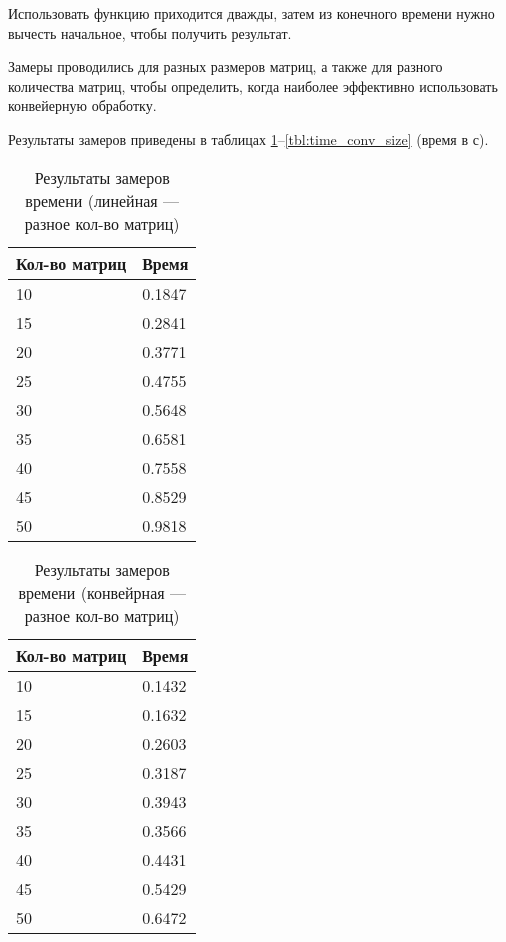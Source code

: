 Использовать функцию приходится дважды, затем из конечного времени нужно вычесть начальное, чтобы получить результат.

Замеры проводились для разных размеров матриц, а также для разного количества матриц, чтобы определить, когда наиболее эффективно использовать конвейерную обработку.

Результаты замеров приведены в таблицах \ref{tbl:time_lin_count}--\ref{tbl:time_conv_size} (время в с).

\begin{table}[h]
	\begin{center}
		\begin{threeparttable}
			\captionsetup{justification=raggedright,singlelinecheck=off}
			\caption{Результаты замеров времени (линейная --- разное кол-во матриц)}
			\label{tbl:time_lin_count}
			\begin{tabular}{|p{6cm}|p{6cm}|}
				\hline
				Кол-во матриц & Время \\
				\hline
				10 & 0.1847 \\ \hline 
				15 & 0.2841 \\ \hline 
				20 & 0.3771 \\ \hline 
				25 & 0.4755 \\ \hline 
				30 & 0.5648 \\ \hline 
				35 & 0.6581 \\ \hline 
				40 & 0.7558 \\ \hline 
				45 & 0.8529 \\ \hline 
				50 & 0.9818 \\ \hline  
			\end{tabular}
		\end{threeparttable}
	\end{center}
\end{table}


\begin{table}[h]
	\begin{center}
		\begin{threeparttable}
			\captionsetup{justification=raggedright,singlelinecheck=off}
			\caption{Результаты замеров времени (конвейрная --- разное кол-во матриц)}
			\label{tbl:time_conv_count}
			\begin{tabular}{|p{6cm}|p{6cm}|}
				\hline
				Кол-во матриц & Время \\
				\hline
				10 & 0.1432 \\ \hline 
				15 & 0.1632 \\ \hline 
				20 & 0.2603 \\ \hline 
				25 & 0.3187 \\ \hline 
				30 & 0.3943 \\ \hline 
				35 & 0.3566 \\ \hline 
				40 & 0.4431 \\ \hline 
				45 & 0.5429 \\ \hline 
				50 & 0.6472 \\ \hline 
				
			\end{tabular}
		\end{threeparttable}
	\end{center}
\end{table}


